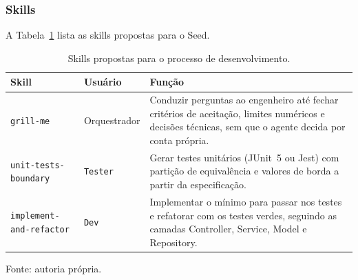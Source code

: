 \subsubsection{Skills}
\label{subsubsec:skills}


A Tabela~\ref{tab:skills-propostas} lista as skills propostas para o Seed.

\renewcommand{\arraystretch}{1.5}
\begin{table}[H]
    \centering
    \caption{Skills propostas para o processo de desenvolvimento.}
    \label{tab:skills-propostas}
    \small

    \begin{tabularx}{\textwidth}{|>{\hsize=0.95\hsize\raggedright\arraybackslash}X|>{\hsize=0.6\hsize\raggedright\arraybackslash}X|>{\hsize=1.45\hsize\raggedright\arraybackslash}X|}
        \hline
        \textbf{Skill} & \textbf{Usuário} & \textbf{Função} \\
        \hline
        \texttt{grill-\allowbreak me} & Orquestrador & Conduzir perguntas ao engenheiro até fechar critérios de aceitação, limites numéricos e decisões técnicas, sem que o agente decida por conta própria. \\
        \hline
        \texttt{unit-\allowbreak tests-\allowbreak boundary} & \texttt{Tester} & Gerar testes unitários (JUnit~5 ou Jest) com partição de equivalência e valores de borda a partir da especificação. \\
        \hline
        \texttt{implement-\allowbreak and-\allowbreak refactor} & \texttt{Dev} & Implementar o mínimo para passar nos testes e refatorar com os testes verdes, seguindo as camadas Controller, Service, Model e Repository. \\
        \hline
    \end{tabularx}

    \vspace{0.5em}
    \small Fonte: autoria própria.
\end{table}



